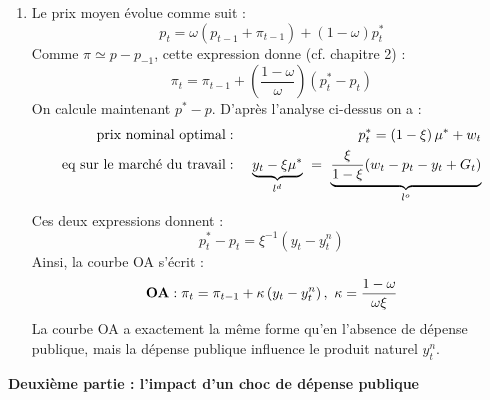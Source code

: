 \documentclass[a4paper,11pt]{article}
\begin{document}
\begin{enumerate}
\item Le prix moyen \'{e}volue comme suit : 
\begin{equation*}
p_{t}=\omega \left( p_{t-1}+\pi _{t-1}\right) +\left( 1-\omega \right)
p_{t}^{\ast }
\end{equation*}%
Comme $\pi \simeq p-p_{-1}$, cette expression donne (cf. chapitre 2) :%
\begin{equation*}
\pi _{t}=\pi _{t-1}+\left( \frac{1-\omega }{\omega }\right) \left(
p_{t}^{\ast }-p_{t}\right)
\end{equation*}%
On calcule maintenant $p^{\ast }-p$. D'apr\`{e}s l'analyse ci-dessus on a :%
\begin{eqnarray*}
\text{prix nominal optimal} &:&p_{t}^{\ast }=\left( 1-\xi \right) \mu ^{\ast
}+w_{t} \\
\text{eq sur le march\'{e} du travail} &:&\ \underset{l^{d}}{\underbrace{%
y_{t}-\xi \mu ^{\ast }}}\ =\ \underset{l^{o}}{\underbrace{\frac{\xi }{1-\xi }%
(w_{t}-p_{t}-y_{t}+G_{t})}}
\end{eqnarray*}%
Ces deux expressions donnent :%
\begin{equation*}
p_{t}^{\ast }-p_{t}=\xi ^{-1}\left( y_{t}-y_{t}^{n}\right)
\end{equation*}%
Ainsi, la courbe OA s'\'{e}crit :%
\begin{equation*}
\text{\textbf{OA}}:\pi _{t}=\pi _{t-1}+\kappa \left( y_{t}-y_{t}^{n}\right)
,\ \kappa =\frac{1-\omega }{\omega \xi }
\end{equation*}%
La courbe OA a exactement la m\^{e}me forme qu'en l'absence de d\'{e}pense
publique, mais la d\'{e}pense publique influence le produit naturel $%
y_{t}^{n}$.
\end{enumerate}

\bigskip

\noindent \textbf{Deuxi\`{e}me partie : l'impact d'un choc de d\'{e}pense
publique}
\end{document}
